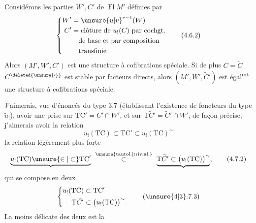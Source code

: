 Considérons les parties $W',C'$ de $\operatorname{Fl}M'$ définies par
\[
\left\{\begin{aligned} W'&=\unsure{u|v}^{*-1}(W)\\ C'&=\text{clôture de }u_!(C)\ \text{par cochgt.}\\ &\quad\text{de base et par composition}\\ &\quad\text{transfinie}
\end{aligned}\right.\tag*{(4.6.2)}
\]
Alors $(M',W',C')$ est une structure à cofibrations spéciale.  Si de plus $C=\widetilde C$ $C^{\deleted{\unsure{\prime}}}$ est stable par facteurs directs, \margin{\uline{NB} C'est là un fait général pour les cat. à cofibrations spéciales, et \unsure{devrait} s'appliquer plus bas\inserted{ (\unsure{add.|cf.} \unsure{5.7.|3.7.3})}. L'hypothèse sur $C$ est inutile ici. [ou \unsure{plutôt|cf. plus bas}, il suffit \unsure{au lieu|en termes} \unsure{de cela|de 4.7} que $W$ soit stable \unsure{par} facteurs directs \uline{et} par composition transfinie, ce qui \unsure{n'est pas|est} \unsure{pour} une hypothèse plus \unsure{rigoureuse|vigoureuse} \unsure{si on y tient|si on}\dots) :}
 alors $(M',W',\widetilde C')$ est égal\textsuperscript{mt} une structure  à cofibrations spéciale.


J'aimerais,  vue d'énoncés du type 3.7 (établissant l'existence de foncteurs du type $\widetilde u_!$), avoir une prise sur $\mathrm{TC}'=C'\cap W'$, et sur $\mathrm{T}\widetilde C'=\widetilde C'\cap W'$, de façon précise, j'aimerais avoir la relation
\[
u_!(\mathrm{TC})\subset\mathrm{TC}'\subset u_!(\mathrm{TC})^{\sim}\tag*{(4.7.1.)}
\]
 la relation légèrement plus forte
\[
\underbrace{u_!(\mathrm{TC})\unsure{\in|\subset}\mathrm{TC}'}\ \overset{\text{\unsure{tautol.|trivial.}}}{\subset}\ \underbrace{\mathrm{T}\widetilde C'\subset\bigl(u_!(\mathrm{TC})\bigr)^{\sim}},\tag*{(4.7.2)}
\]
qui se compose  en deux
\[
\left\{\begin{aligned} u_!(\mathrm{TC})&\subset\mathrm{TC}'\\ \mathrm{T}\widetilde C'&\subset\bigl(u_!(\mathrm{TC})\bigr)^{\sim}.
\end{aligned}\right.\tag*{(\unsure{4|3}.7.3)}
\]
La  moins délicate des deux est la

